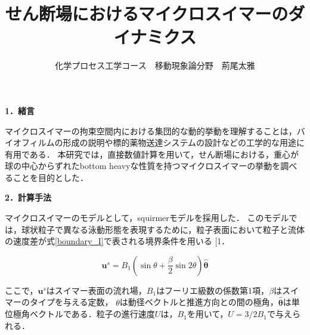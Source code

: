 \documentclass[twocolumns,10pt,a4j]{jarticle}
\title{\Large せん断場におけるマイクロスイマーのダイナミクス\vspace{-3truemm}}
\author{\large 化学プロセス工学コース　移動現象論分野　荊尾太雅\vspace{-10zh}}
\date{}
\makeatletter
\DeclareRobustCommand\cite{\unskip
  \@ifnextchar[{\@tempswatrue\@citex}{\@tempswafalse\@citex[]}}
\makeatother
\begin{document}



  \noindent
  \textbf{\large 1．緒言}
  \par
マイクロスイマーの拘束空間内における集団的な動的挙動を理解することは，バイオフィルムの形成の説明や標的薬物送達システムの設計などの工学的な用途に有用である．
本研究では，直接数値計算を用いて，せん断場における，重心が球の中心からずれたbottom heavyな性質を持つマイクロスイマーの挙動を調べることを目的とした．


  \noindent
  \textbf{\large 2．計算手法}
  \par
マイクロスイマーのモデルとして，squirmerモデルを採用した．
このモデルでは，球状粒子で異なる泳動形態を表現するために，粒子表面において粒子と流体の速度差が式\eqref{boundary_I}で表される境界条件を用いる\cite{1}．

  \vspace{-3truemm}
    \begin{equation}
      \boldsymbol{u}^s = B_1 \left( \sin{\theta} + \frac{\beta}{2} \sin{2\theta} \right) \hat{\boldsymbol{\theta}}
      \label{boundary_I}
    \end{equation}
  \vspace{-4truemm}

  \noindent
ここで，$\boldsymbol{u}^s$はスイマー表面の流れ場，$B_1$はフーリエ級数の係数第1項，$\beta$はスイマーのタイプを与える定数，
$\theta$は動径ベクトルと推進方向との間の極角，$\hat{\boldsymbol{\theta}}$は単位極角ベクトルである．粒子の進行速度$U$は，$B_1$を用いて，$U = 3/2B_1$で与えられる．
\end{document}
